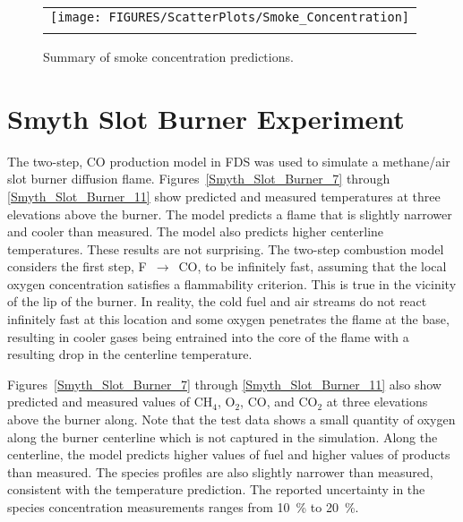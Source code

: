 \begin{figure}[p]
\begin{center}
\begin{tabular}{c}
\texttt{[image: FIGURES/ScatterPlots/Smoke\_Concentration]} \\
\vspace{0.25in} \\
\end{tabular}
\end{center}
\caption[Summary of smoke concentration predictions]
{Summary of smoke concentration predictions.}
\end{figure}



\clearpage

\section{Smyth Slot Burner Experiment}

The two-step, CO production model in FDS was used to simulate a methane/air slot burner diffusion flame.
Figures~\ref{Smyth_Slot_Burner_7} through \ref{Smyth_Slot_Burner_11}
show predicted and measured temperatures at three elevations above the burner.  The model predicts a flame that is slightly narrower
and cooler than measured.  The model
also predicts higher centerline temperatures.  These results are not surprising.  The two-step combustion model considers
the first step, F~$\longrightarrow$~CO, to be infinitely fast, assuming that the local oxygen concentration satisfies a
flammability criterion.  This is true in the vicinity of the lip of the burner.  In reality, the cold fuel and air
streams do not react infinitely fast at this location and some oxygen penetrates the flame at the base, resulting in cooler
gases being entrained into the core of the flame with a resulting drop in the centerline temperature.

Figures~\ref{Smyth_Slot_Burner_7} through \ref{Smyth_Slot_Burner_11} also show predicted and
measured values of CH$_4$, O$_2$, CO,  and CO$_2$ at three elevations above the burner along.
Note that the test data shows a small quantity of oxygen along
the burner centerline which is not captured in the simulation.  Along the centerline, the model predicts higher values of fuel and higher values of
products than measured.  The species profiles are also slightly narrower than measured, consistent with the temperature prediction.
The reported uncertainty in the species concentration measurements ranges from 10~\% to 20~\%.


